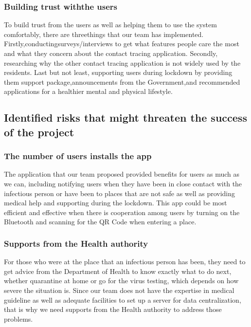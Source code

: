     \subsubsection{Building trust withthe users}
      \par To build trust from the users as well as helping them to use the system comfortably, there are threethings  that  our  team  has implemented.  Firstly,conductingsurveys/interviews  to  get what features people care the most and what they concern about the contact tracing application. Secondly, researching why the other  contact  tracing  application  is  not  widely  used  by the residents.  Last  but  not  least, supporting users  during  lockdown  by providing  them support package,announcements  from  the  Government,and  recommended  applications for  a healthier mental and physical lifestyle.

  \subsection{Identified  risks  that  might  threaten  the  success  of  the project}
    \subsubsection{The number of users installs the app}
      \par The application that our team proposed provided benefits for users as much as we can, including notifying users when they have been in close contact with the infectious person or have been to places that are not safe as well as providing medical help and supporting during the lockdown. This app could be most efficient and effective when there is cooperation among users by turning on the Bluetooth and scanning for the QR Code when entering a place.

    \subsubsection{Supports from the Health authority}
      \par For those who were at the place that an infectious person has been, they need to get advice from the Department of Health to know exactly what to do next, whether quarantine at home or go for the virus testing, which depends on how severe the situation is. Since our team does not have the expertise  in  medical  guideline as  well  as  adequate  facilities  to  set  up  a  server  for  data centralization, that is why we need supports from the Health authority to address those problems.
